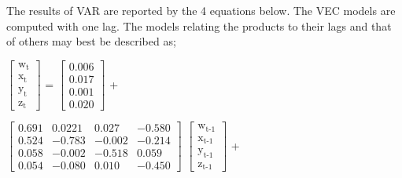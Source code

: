 \documentclass{beamer}
\newcommand{\vspaceFive}{\vspace{5pt}}
\newcommand{\subTT}[2]{\text{#1}_{\text{#2}}}
\newcommand{\varGasoline}{w}
\newcommand{\varGasoil}{x}
\newcommand{\varKerosene}{y}
\newcommand{\varLpg}{z}
\begin{document}
	\begin{frame}
		\begin{block}{}
			The results of VAR are reported by the 4 equations below. The VEC models are computed with one lag. The models relating the products to their lags and that of others may best be described as;
		\end{block} \vspaceFive
		
			\begin{math}
				\begin{bmatrix}
					\subTT{\varGasoline}{t} \\
					\subTT{\varGasoil}{t} \\
					\subTT{\varKerosene}{t} \\
					\subTT{\varLpg}{t}
				\end{bmatrix}
			\end{math}
			=
			\begin{math}
				\begin{bmatrix}
					0.006 \\
					0.017 \\
					0.001 \\
					0.020
				\end{bmatrix}
			\end{math}
			+
			
			\begin{math}
				\begin{bmatrix}
					0.691 & 0.0221 & 0.027 & -0.580 \\
					0.524 & -0.783 & -0.002 & -0.214 \\
					0.058 & -0.002 & -0.518 & 0.059 \\
					0.054 & -0.080 & 0.010 & -0.450
				\end{bmatrix}
			\end{math}
			\begin{math}
				\begin{bmatrix}
					\subTT{\varGasoline}{t-1} \\
					\subTT{\varGasoil}{t-1} \\
					\subTT{\varKerosene}{t-1} \\
					\subTT{\varLpg}{t-1}
				\end{bmatrix}
			\end{math}
			+
			

\end{frame}
\end{document}
